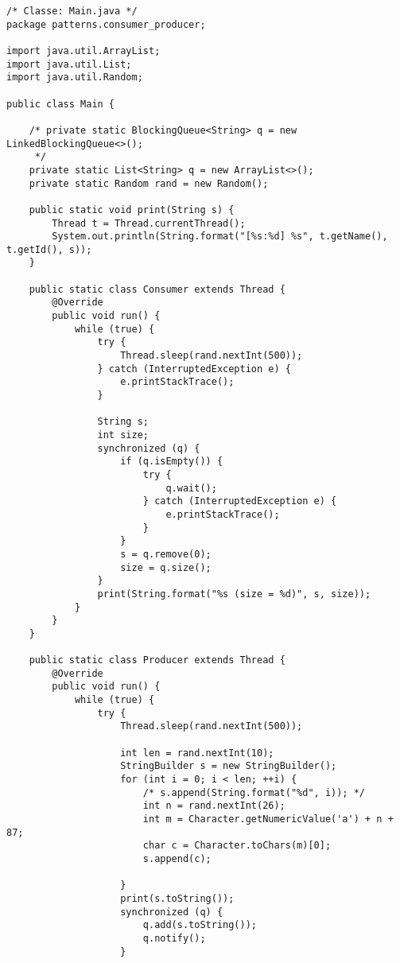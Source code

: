 \begin{lstlisting}
/* Classe: Main.java */
package patterns.consumer_producer;

import java.util.ArrayList;
import java.util.List;
import java.util.Random;

public class Main {

    /* private static BlockingQueue<String> q = new LinkedBlockingQueue<>();
     */
    private static List<String> q = new ArrayList<>();
    private static Random rand = new Random();

    public static void print(String s) {
        Thread t = Thread.currentThread();
        System.out.println(String.format("[%s:%d] %s", t.getName(), t.getId(), s));
    }

    public static class Consumer extends Thread {
        @Override
        public void run() {
            while (true) {
                try {
                    Thread.sleep(rand.nextInt(500));
                } catch (InterruptedException e) {
                    e.printStackTrace();
                }

                String s;
                int size;
                synchronized (q) {
                    if (q.isEmpty()) {
                        try {
                            q.wait();
                        } catch (InterruptedException e) {
                            e.printStackTrace();
                        }
                    }
                    s = q.remove(0);
                    size = q.size();
                }
                print(String.format("%s (size = %d)", s, size));
            }
        }
    }

    public static class Producer extends Thread {
        @Override
        public void run() {
            while (true) {
                try {
                    Thread.sleep(rand.nextInt(500));

                    int len = rand.nextInt(10);
                    StringBuilder s = new StringBuilder();
                    for (int i = 0; i < len; ++i) {
                        /* s.append(String.format("%d", i)); */
                        int n = rand.nextInt(26);
                        int m = Character.getNumericValue('a') + n + 87;
                        char c = Character.toChars(m)[0];
                        s.append(c);

                    }
                    print(s.toString());
                    synchronized (q) {
                        q.add(s.toString());
                        q.notify();
                    }


\end{lstlisting}
